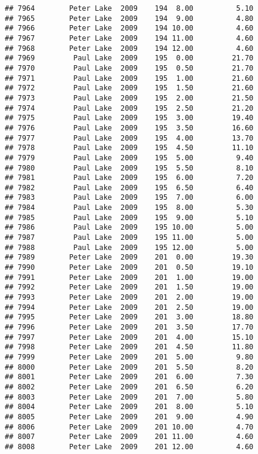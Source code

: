 \documentclass[
]{article}
\begin{document}
\begin{verbatim}
## 7964        Peter Lake  2009    194  8.00          5.10
## 7965        Peter Lake  2009    194  9.00          4.80
## 7966        Peter Lake  2009    194 10.00          4.60
## 7967        Peter Lake  2009    194 11.00          4.60
## 7968        Peter Lake  2009    194 12.00          4.60
## 7969         Paul Lake  2009    195  0.00         21.70
## 7970         Paul Lake  2009    195  0.50         21.70
## 7971         Paul Lake  2009    195  1.00         21.60
## 7972         Paul Lake  2009    195  1.50         21.60
## 7973         Paul Lake  2009    195  2.00         21.50
## 7974         Paul Lake  2009    195  2.50         21.20
## 7975         Paul Lake  2009    195  3.00         19.40
## 7976         Paul Lake  2009    195  3.50         16.60
## 7977         Paul Lake  2009    195  4.00         13.70
## 7978         Paul Lake  2009    195  4.50         11.10
## 7979         Paul Lake  2009    195  5.00          9.40
## 7980         Paul Lake  2009    195  5.50          8.10
## 7981         Paul Lake  2009    195  6.00          7.20
## 7982         Paul Lake  2009    195  6.50          6.40
## 7983         Paul Lake  2009    195  7.00          6.00
## 7984         Paul Lake  2009    195  8.00          5.30
## 7985         Paul Lake  2009    195  9.00          5.10
## 7986         Paul Lake  2009    195 10.00          5.00
## 7987         Paul Lake  2009    195 11.00          5.00
## 7988         Paul Lake  2009    195 12.00          5.00
## 7989        Peter Lake  2009    201  0.00         19.30
## 7990        Peter Lake  2009    201  0.50         19.10
## 7991        Peter Lake  2009    201  1.00         19.00
## 7992        Peter Lake  2009    201  1.50         19.00
## 7993        Peter Lake  2009    201  2.00         19.00
## 7994        Peter Lake  2009    201  2.50         19.00
## 7995        Peter Lake  2009    201  3.00         18.80
## 7996        Peter Lake  2009    201  3.50         17.70
## 7997        Peter Lake  2009    201  4.00         15.10
## 7998        Peter Lake  2009    201  4.50         11.80
## 7999        Peter Lake  2009    201  5.00          9.80
## 8000        Peter Lake  2009    201  5.50          8.20
## 8001        Peter Lake  2009    201  6.00          7.30
## 8002        Peter Lake  2009    201  6.50          6.20
## 8003        Peter Lake  2009    201  7.00          5.80
## 8004        Peter Lake  2009    201  8.00          5.10
## 8005        Peter Lake  2009    201  9.00          4.90
## 8006        Peter Lake  2009    201 10.00          4.70
## 8007        Peter Lake  2009    201 11.00          4.60
## 8008        Peter Lake  2009    201 12.00          4.60

\end{verbatim}
\end{document}
